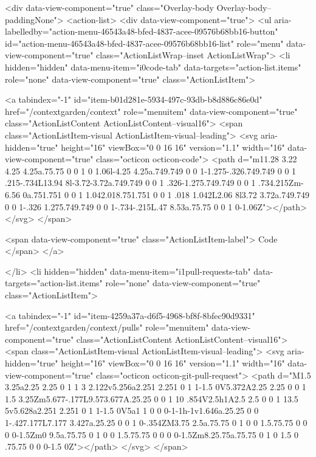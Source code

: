       <div data-view-component="true" class="Overlay-body Overlay-body--paddingNone">          <action-list>
  <div data-view-component="true">
    <ul aria-labelledby="action-menu-46543a48-bfed-4837-acee-09576b68bb16-button" id="action-menu-46543a48-bfed-4837-acee-09576b68bb16-list" role="menu" data-view-component="true" class="ActionListWrap--inset ActionListWrap">
        <li hidden="hidden" data-menu-item="i0code-tab" data-targets="action-list.items" role="none" data-view-component="true" class="ActionListItem">
    
    
    <a tabindex="-1" id="item-b01d281e-5934-497c-93db-b8d886c86e0d" href="/contextgarden/context" role="menuitem" data-view-component="true" class="ActionListContent ActionListContent--visual16">
        <span class="ActionListItem-visual ActionListItem-visual--leading">
          <svg aria-hidden="true" height="16" viewBox="0 0 16 16" version="1.1" width="16" data-view-component="true" class="octicon octicon-code">
    <path d="m11.28 3.22 4.25 4.25a.75.75 0 0 1 0 1.06l-4.25 4.25a.749.749 0 0 1-1.275-.326.749.749 0 0 1 .215-.734L13.94 8l-3.72-3.72a.749.749 0 0 1 .326-1.275.749.749 0 0 1 .734.215Zm-6.56 0a.751.751 0 0 1 1.042.018.751.751 0 0 1 .018 1.042L2.06 8l3.72 3.72a.749.749 0 0 1-.326 1.275.749.749 0 0 1-.734-.215L.47 8.53a.75.75 0 0 1 0-1.06Z"></path>
</svg>
        </span>
      
        <span data-view-component="true" class="ActionListItem-label">
          Code
</span>      
</a>
  
</li>
        <li hidden="hidden" data-menu-item="i1pull-requests-tab" data-targets="action-list.items" role="none" data-view-component="true" class="ActionListItem">
    
    
    <a tabindex="-1" id="item-4259a37a-d6f5-4968-bf8f-8bfec90d9331" href="/contextgarden/context/pulls" role="menuitem" data-view-component="true" class="ActionListContent ActionListContent--visual16">
        <span class="ActionListItem-visual ActionListItem-visual--leading">
          <svg aria-hidden="true" height="16" viewBox="0 0 16 16" version="1.1" width="16" data-view-component="true" class="octicon octicon-git-pull-request">
    <path d="M1.5 3.25a2.25 2.25 0 1 1 3 2.122v5.256a2.251 2.251 0 1 1-1.5 0V5.372A2.25 2.25 0 0 1 1.5 3.25Zm5.677-.177L9.573.677A.25.25 0 0 1 10 .854V2.5h1A2.5 2.5 0 0 1 13.5 5v5.628a2.251 2.251 0 1 1-1.5 0V5a1 1 0 0 0-1-1h-1v1.646a.25.25 0 0 1-.427.177L7.177 3.427a.25.25 0 0 1 0-.354ZM3.75 2.5a.75.75 0 1 0 0 1.5.75.75 0 0 0 0-1.5Zm0 9.5a.75.75 0 1 0 0 1.5.75.75 0 0 0 0-1.5Zm8.25.75a.75.75 0 1 0 1.5 0 .75.75 0 0 0-1.5 0Z"></path>
</svg>
        </span>
      
